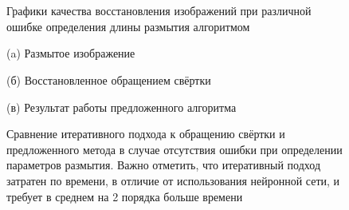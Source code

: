 \begin{figure}[H]
\begin{minipage}[t]{1\linewidth}
\\ 
\end{minipage}
\begin{minipage}[t]{1\linewidth}
\\
\end{minipage}
\caption{ Графики качества восстановления изображений при различной ошибке определения длины размытия алгоритмом }
\label{ris:plots_l}
\end{figure}


\begin{figure}[H]
\begin{minipage}[t]{0.3\linewidth}
(a) Размытое изображение\\ 
\end{minipage}
\hfill
\begin{minipage}[t]{0.3\linewidth}
(б) Восстановленное обращением свёртки\\ 
\end{minipage}
\hfill
\begin{minipage}[t]{0.3\linewidth}
(в) Результат работы предложенного алгоритма\\ 
\end{minipage}


\caption{ Сравнение итеративного подхода к обращению свёртки и предложенного метода в случае отсутствия ошибки при определении параметров размытия. Важно отметить, что итеративный подход затратен по времени, в отличие от использования нейронной сети, и требует в среднем на 2 порядка больше времени}
\label{ris:restore_comparison}
\end{figure}

